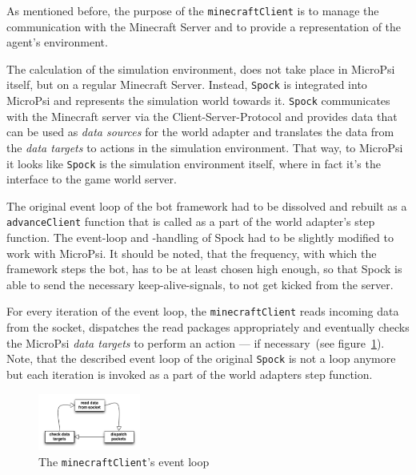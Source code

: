 As mentioned before, the purpose of the \texttt{minecraftClient} is to manage the communication with the Minecraft Server and to provide a representation of the agent's environment.

The calculation of the simulation environment, does not take place in MicroPsi itself, but on a regular Minecraft Server. Instead, \texttt{Spock} is integrated into MicroPsi and represents the simulation world towards it. \texttt{Spock} communicates with the Minecraft server via the Client-Server-Protocol and provides data that can be used as \emph{data sources} for the world adapter and translates the data from the \emph{data targets} to actions in the simulation environment. That way, to MicroPsi it looks like \texttt{Spock} is the simulation environment itself, where in fact it's the interface to the game world server.

The original event loop of the bot framework had to be dissolved and rebuilt as a \texttt{advanceClient} function that is called as a part of the world adapter's step function. The event-loop and -handling of Spock had to be slightly modified to work with MicroPsi. It should be noted, that the frequency, with which the framework steps the bot, has to be at least chosen high enough, so that Spock is able to send the necessary keep-alive-signals, to not get kicked from the server.

For every iteration of the event loop, the \texttt{minecraftClient} reads incoming data from the socket, dispatches the read packages appropriately and eventually checks the MicroPsi \emph{data targets} to perform an action --- if necessary~(see figure~\ref{spock_loop}). Note, that the described event loop of the original \texttt{Spock} is not a loop anymore but each iteration is invoked as a part of the world adapters step function.


\begin{figure}
  \begin{center}
    \includegraphics[width=0.3\textwidth]{graphics/spock_eventloop}
  \end{center}
  \caption{The \texttt{minecraftClient}'s event loop}
  \label{spock_loop}
\end{figure}

